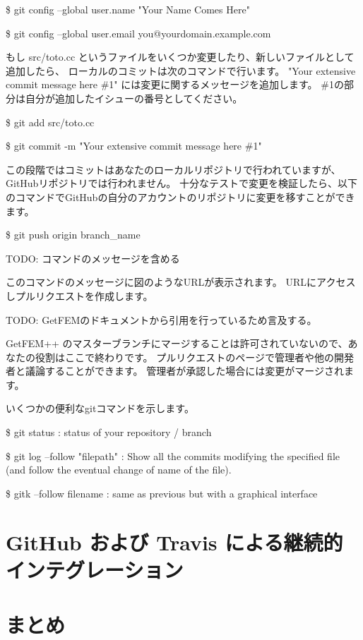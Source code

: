 \documentclass{ltjoc}
\begin{document}
\$ git config --global user.name "Your Name Comes Here"

\$ git config --global user.email you@yourdomain.example.com

もし src/toto.cc というファイルをいくつか変更したり、新しいファイルとして追加したら、
ローカルのコミットは次のコマンドで行います。
"Your extensive commit message here \#1" には変更に関するメッセージを追加します。
\#1の部分は自分が追加したイシューの番号としてください。

\$ git add src/toto.cc

\$ git commit -m "Your extensive commit message here \#1"

この段階ではコミットはあなたのローカルリポジトリで行われていますが、GitHubリポジトリでは行われません。
十分なテストで変更を検証したら、以下のコマンドでGitHubの自分のアカウントのリポジトリに変更を移すことができます。

\$ git push origin branch\_name

TODO: コマンドのメッセージを含める

このコマンドのメッセージに図のようなURLが表示されます。
URLにアクセスしプルリクエストを作成します。

TODO: GetFEMのドキュメントから引用を行っているため言及する。

GetFEM++ のマスターブランチにマージすることは許可されていないので、あなたの役割はここで終わりです。
プルリクエストのページで管理者や他の開発者と議論することができます。
管理者が承認した場合には変更がマージされます。

いくつかの便利なgitコマンドを示します。

\$ git status  : status of your repository / branch

\$ git log --follow "filepath"   : Show all the commits modifying the specified file (and follow the eventual change of name of the file).

\$ gitk --follow filename : same as previous but with a graphical interface

\section{GitHub および Travis による継続的インテグレーション}
\section{まとめ}


\end{document}
